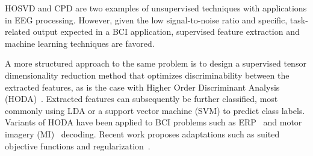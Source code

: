 HOSVD and CPD are two examples of unsupervised techniques with applications in EEG
processing.
However, given the low signal-to-noise ratio and
specific, task-related output expected in a BCI application,
supervised feature extraction and machine learning techniques are
favored.

A more structured approach to the same problem is to design a supervised
tensor dimensionality reduction method that optimizes discriminability between the
extracted features, as is the case with Higher Order Discriminant
Analysis (HODA)~\cite{Yan2005,Phan2010,Froelich2018}.
Extracted features can subsequently be further classified, most commonly
using LDA or a support vector machine (SVM) to predict class labels.
Variants of HODA have been applied to BCI problems such as
ERP~\cite{Onishi2012,Higashi2016} and motor imagery (MI)~\cite{Liu2015,Cai2021}
decoding.
Recent work proposes adaptations such as suited objective
functions and regularization~\cite{Jamshidi2017,Jorajuria2022,Aghili2023}.

